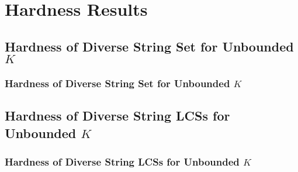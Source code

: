 \documentclass{beamer}
\begin{document}
\section{Hardness Results}
\subsection{Hardness of Diverse String Set for Unbounded $K$}
\begin{frame}
    \frametitle{Hardness of Diverse String Set for Unbounded $K$}

\end{frame}

\subsection{Hardness of Diverse String LCSs for Unbounded $K$}
\begin{frame}
    \frametitle{Hardness of Diverse String LCSs for Unbounded $K$}

\end{frame}
\end{document}
